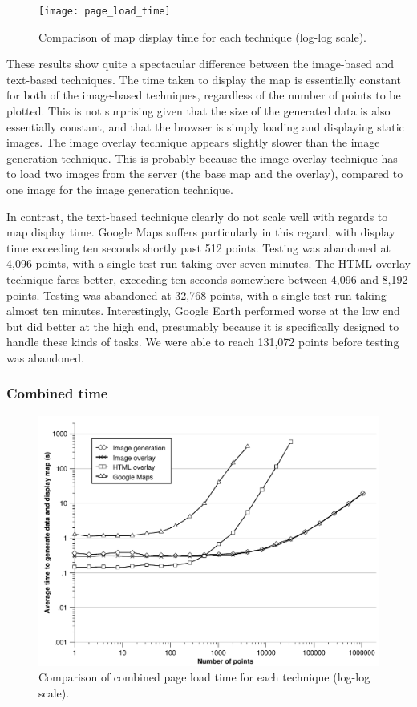 \documentclass[acmtocl,acmnow]{acmtrans2m}
\begin{document}
\begin{figure}
	\centering
	\texttt{[image: page\_load\_time]}
	\caption{Comparison of map display time for each technique (log-log scale).}
	\label{fig-page-load-time}
\end{figure}


These results show quite a spectacular difference between the
image-based and text-based techniques. The time taken to display the map
is essentially constant for both of the image-based techniques,
regardless of the number of points to be plotted. This is not surprising
given that the size of the generated data is also essentially constant,
and that the browser is simply loading and displaying static images. The
image overlay technique appears slightly slower than the image
generation technique. This is probably because the image overlay
technique has to load two images from the server (the base map and the
overlay), compared to one image for the image generation technique.

In contrast, the text-based technique clearly do not scale well with
regards to map display time. Google Maps suffers particularly in this
regard, with display time exceeding ten seconds shortly past 512 points.
Testing was abandoned at 4,096 points, with a single test run taking
over seven minutes. The HTML overlay technique fares better, exceeding
ten seconds somewhere between 4,096 and 8,192 points. Testing was
abandoned at 32,768 points, with a single test run taking almost ten
minutes. Interestingly, Google Earth performed worse at the low end but
did better at the high end, presumably because it is specifically
designed to handle these kinds of tasks. We were able to reach 131,072
points before testing was abandoned.


\subsubsection{Combined time}


\begin{figure}
	\centering
	\includegraphics[scale=0.66]{combined_time}
	\caption{Comparison of combined page load time for each technique (log-log scale).}
	\label{fig-combined-time}
\end{figure}
\end{document}
